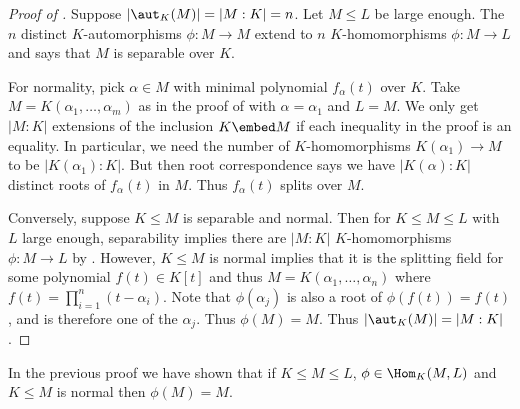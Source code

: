 \documentclass[a4paper]{article}
\begin{document}
\begin{proof}[Proof of ]
  \label{proof:galois criterion}
  Suppose \(|\aut_K(M)| = |M:K| = n\). Let \(M \leq L\) be large enough. The \(n\) distinct \(K\)-automorphisms \(\phi: M \to M\) extend to \(n\) \(K\)-homomorphisms \(\phi: M \to L\) and  says that \(M\) is separable over \(K\).

  For normality, pick \(\alpha \in M\) with minimal polynomial \(f_\alpha(t)\) over \(K\). Take \(M = K(\alpha_1, \dots, \alpha_m)\) as in the proof of  with \(\alpha = \alpha_1\) and \(L = M\). We only get \(|M:K|\) extensions of the inclusion \(K \embed M\) if each inequality in the proof is an equality. In particular, we need the number of \(K\)-homomorphisms \(K(\alpha_1) \to M\) to be \(|K(\alpha_1):K|\). But then root correspondence says we have \(|K(\alpha):K|\) distinct roots of \(f_\alpha(t)\) in \(M\). Thus \(f_\alpha(t)\) splits over \(M\).

  Conversely, suppose \(K \leq M\) is separable and normal. Then for \(K \leq M \leq L\) with \(L\) large enough, separability implies there are \(|M:K|\) \(K\)-homomorphisms \(\phi: M \to L\) by . However, \(K \leq M\) is normal implies that it is the splitting field for some polynomial \(f(t) \in K[t]\) and thus \(M = K(\alpha_1, \dots, \alpha_n)\) where \(f(t) = \prod_{i = 1}^n (t - \alpha_i)\). Note that \(\phi(\alpha_j)\) is also a root of \(\phi(f(t)) = f(t)\), and is therefore one of the \(\alpha_j\). Thus \(\phi(M) = M\). Thus \(|\aut_K(M)| = |M:K|\).
\end{proof}

\begin{remark}
  In the previous proof we have shown that if \(K \leq M \leq L\), \(\phi \in \Hom_K(M, L)\) and \(K \leq M\) is normal then \(\phi(M) = M\).
\end{remark}
\end{document}
